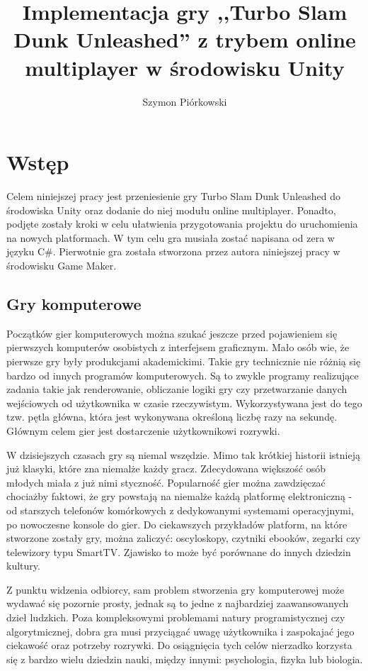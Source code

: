\documentclass[a4paper,12pt,twoside,openany]{report}
\title{Implementacja gry ,,Turbo Slam Dunk Unleashed'' z trybem online multiplayer w środowisku Unity}
\author{Szymon Piórkowski}
\begin{document}
\maketitle

\chapter{Wstęp}
Celem niniejszej pracy jest przeniesienie gry Turbo Slam Dunk Unleashed do środowiska Unity oraz dodanie do niej modułu online multiplayer. Ponadto, podjęte zostały kroki w celu ułatwienia przygotowania projektu do uruchomienia na nowych platformach. W tym celu gra musiała zostać napisana od zera w języku C\#. Pierwotnie gra została stworzona przez autora niniejszej pracy w środowisku Game Maker.

\section{Gry komputerowe}
Początków gier komputerowych można szukać jeszcze przed pojawieniem się pierwszych komputerów osobistych z interfejsem graficznym. Mało osób wie, że pierwsze gry były produkcjami akademickimi. Takie gry technicznie nie różnią się bardzo od innych programów komputerowych. Są to zwykle programy realizujące zadania takie jak renderowanie, obliczanie logiki gry czy przetwarzanie danych wejściowych od użytkownika w czasie rzeczywistym. Wykorzystywana jest do tego tzw. pętla główna, która jest wykonywana określoną liczbę razy na sekundę. Głównym celem gier jest dostarczenie użytkownikowi rozrywki.

W dzisiejszych czasach gry są niemal wszędzie. Mimo tak krótkiej historii istnieją już klasyki, które zna niemalże każdy gracz. Zdecydowana większość osób młodych miała z już nimi styczność. Popularność gier można zawdzięczać chociażby faktowi, że gry powstają na niemalże każdą platformę elektroniczną - od starszych telefonów komórkowych z dedykowanymi systemami operacyjnymi, po nowoczesne konsole do gier. Do ciekawszych przykładów platform, na które stworzone zostały gry, można zaliczyć: oscyloskopy, czytniki ebooków, zegarki czy telewizory typu SmartTV. Zjawisko to może być porównane do innych dziedzin kultury.

Z punktu widzenia odbiorcy, sam problem stworzenia gry komputerowej może wydawać się pozornie prosty, jednak są to jedne z najbardziej zaawansowanych dzieł ludzkich. Poza kompleksowymi problemami natury programistycznej czy algorytmicznej, dobra gra musi przyciągać uwagę użytkownika i zaspokajać jego ciekawość oraz potrzeby rozrywki. Do osiągnięcia tych celów nierzadko korzysta się z bardzo wielu dziedzin nauki, między innymi: psychologia, fizyka lub biologia.
\end{document}
